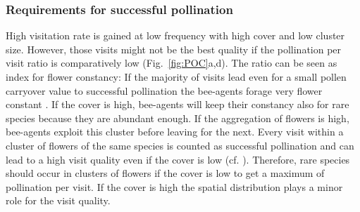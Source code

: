 
\subsubsection*{Requirements for successful pollination}
High visitation rate is gained at low frequency with high cover and low cluster size. However, those visits might not be the best quality if the pollination per visit ratio is comparatively low (Fig.~\ref{fig:POC}a,d). The ratio can be seen as index for flower constancy: If the majority of visits lead even for a small pollen carryover value to successful pollination the bee-agents forage very flower constant \citep{montgomery2009pollen}. If the cover is high, bee-agents will keep their constancy also for rare species because they are abundant enough. If the aggregation of flowers is high, bee-agents exploit this cluster before leaving for the next. Every visit within a cluster of flowers of the same species is counted as successful pollination and can lead to a high visit quality even if the cover is low (cf. \citealt{jakobsson2009relationships}). Therefore, rare species should occur in clusters of flowers if the cover is low to get a maximum of pollination per visit. If the cover is high the spatial distribution plays a minor role for the visit quality.  


